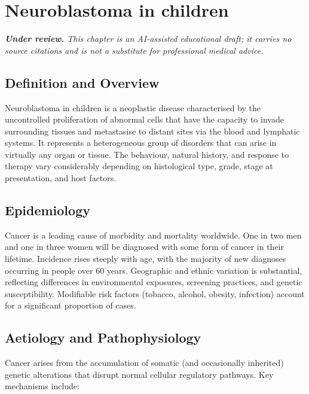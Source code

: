 \chapter{Neuroblastoma in children}

\medskip
\noindent\textit{\textbf{Under review.} This chapter is an AI-assisted educational draft; it carries no source citations and is not a substitute for professional medical advice.}

\section*{Definition and Overview}
Neuroblastoma in children is a neoplastic disease characterised by the uncontrolled proliferation of abnormal cells that have the capacity to invade surrounding tissues and metastasise to distant sites via the blood and lymphatic systems. It represents a heterogeneous group of disorders that can arise in virtually any organ or tissue. The behaviour, natural history, and response to therapy vary considerably depending on histological type, grade, stage at presentation, and host factors.

\section*{Epidemiology}
Cancer is a leading cause of morbidity and mortality worldwide. One in two men and one in three women will be diagnosed with some form of cancer in their lifetime. Incidence rises steeply with age, with the majority of new diagnoses occurring in people over 60 years. Geographic and ethnic variation is substantial, reflecting differences in environmental exposures, screening practices, and genetic susceptibility. Modifiable risk factors (tobacco, alcohol, obesity, infection) account for a significant proportion of cases.

\section*{Aetiology and Pathophysiology}
Cancer arises from the accumulation of somatic (and occasionally inherited) genetic alterations that disrupt normal cellular regulatory pathways. Key mechanisms include:

